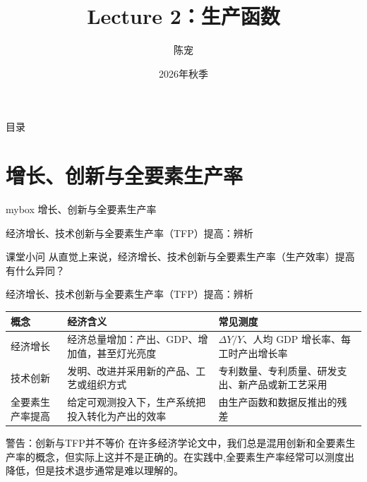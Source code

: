 \documentclass[aspectratio=32]{beamer}
\title[Lecture 2: 生产函数]{Lecture 2：生产函数}
\author{陈宠\inst{1}}
\institute{中国人民大学经济学院\inst{1}}
\date{2026年秋季}
\begin{document}
\begin{frame}
\maketitle
\end{frame}

\begin{frame}{目录}
\tableofcontents[hideallsubsections]
\end{frame}

\section{增长、创新与全要素生产率}
\begin{frame}
\begin{center}
    \begin{minipage}{1\textwidth}
		\begin{beamercolorbox}[wd=0.7\textwidth, rounded=true, shadow=true]{mybox}
			\LARGE \centering 增长、创新与全要素生产率
		\end{beamercolorbox}
    \end{minipage}
\end{center} 
\end{frame}

\begin{frame}{经济增长、技术创新与全要素生产率（TFP）提高：辨析}
\begin{center}
\begin{block}{课堂小问}
从直觉上来说，经济增长、技术创新与全要素生产率（生产效率）提高有什么异同？
\end{block}
\end{center}
\end{frame}



\begin{frame}{经济增长、技术创新与全要素生产率（TFP）提高：辨析}
\small
\begin{tabularx}{\textwidth}{>{\raggedright\arraybackslash}p{2.5cm}
    >{\raggedright\arraybackslash}X >{\raggedright\arraybackslash}X}
\toprule
概念 & 经济含义 & 常见测度 \\
\midrule
经济增长
& 经济总量增加：产出、GDP、增加值，甚至灯光亮度
& $\Delta Y/Y$、人均 GDP 增长率、每工时产出增长率 \\
\addlinespace
技术创新
& 发明、改进并采用新的产品、工艺或组织方式
& 专利数量、专利质量、研发支出、新产品或新工艺采用 \\
\addlinespace
全要素生产率提高
& 给定可观测投入下，生产系统把投入转化为产出的效率
& 由生产函数和数据反推出的残差\\
\bottomrule
\end{tabularx}
\vspace{0.35cm}
\begin{alertblock}{警告：创新与TFP并不等价}
在许多经济学论文中，我们总是混用创新和全要素生产率的概念，但实际上这并不是正确的。在实践中,全要素生产率经常可以测度出降低，但是技术退步通常是难以理解的。
\end{alertblock}
\end{frame}
\end{document}
